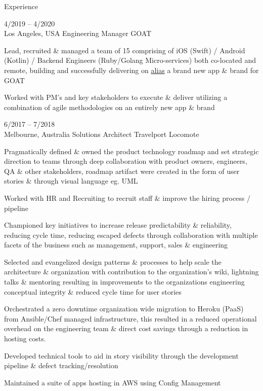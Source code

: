 \documentclass[9pt]{developercv} %
\begin{document}
\begin{cvsect}{Experience}

  \begin{entrylist}
    \entry
      {4/2019 -- 4/2020\\\footnotesize{Los Angeles, USA}}
      {Engineering Manager}
      {GOAT}
      {Lead, recruited \& managed a team of 15 comprising of iOS (Swift) / Android
      (Kotlin) / Backend Engineers (Ruby/Golang Micro-services)  both co-located
      and remote, building and successfully delivering on \href{https://apps.apple.com/us/app/id1467090341}{alias} a brand new app \& brand for GOAT
      \par\medskip Worked with PM’s and key stakeholders to execute \& deliver utilizing a
      combination of agile methodologies on an entirely new app \& brand}
    \entry
      {6/2017 -- 7/2018\\\footnotesize{Melbourne, Australia}}
      {Solutions Architect}
      {Travelport Locomote}
      {
      Pragmatically defined \& owned the product technology roadmap and set
      strategic direction to teams through deep collaboration with product owners,
      engineers, QA \& other stakeholders, roadmap artifact were created in the form of user stories \& through visual language eg. UML
      \par\medskip Worked with HR and Recruiting to recruit staff \& improve the hiring process / pipeline
      \par\medskip Championed key initiatives to increase release predictability \& reliability, reducing cycle time, reducing escaped defects through
      collaboration with multiple facets of the business such as management, support, sales \& engineering
  \par\medskip Selected and evangelized design patterns \& processes to help scale
    the architecture \& organization with contribution to the organization's wiki,
    lightning talks \& mentoring resulting in improvements to the organizations engineering conceptual integrity \& reduced cycle time for user stories
  \par\medskip Orchestrated a zero downtime organization wide migration to Heroku (PaaS) from Ansible/Chef managed infrastructure, this resulted in a reduced operational overhead on the engineering team \& direct cost savings through a reduction in hosting costs.
  \par\medskip Developed technical tools to aid in story visibility through the
      development pipeline \& defect tracking/resolution 
  \par\medskip Maintained a suite of apps hosting in AWS using Config Management
}
\end{entrylist}
\end{cvsect}
\end{document}
